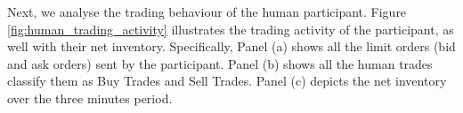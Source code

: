Next, we analyse the trading behaviour of the human participant. Figure \ref{fig:human_trading_activity} illustrates the trading activity of the participant, as well with their net inventory. Specifically, Panel (a) shows all the limit orders (bid and ask orders) sent by the participant. Panel (b) shows all the human trades classify them as Buy Trades and Sell Trades. Panel (c) depicts the net inventory over the three minutes period.
\begin{figure}[!htbp]
    \centering
    \qquad
    \qquad

\end{figure}
